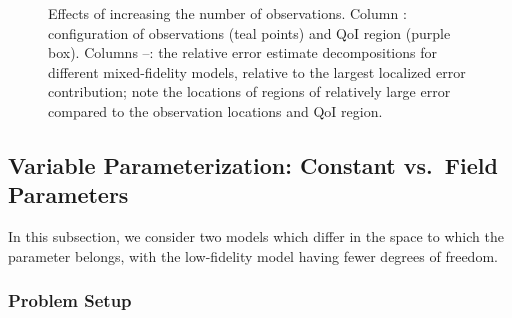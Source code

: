 \documentclass[review,sort&compress]{elsarticle}
\begin{document}
\begin{figure}[htbp]
{  \label{subfig:obsMFlast2}
}
  \caption{Effects of increasing the number of observations. Column \protect{}: configuration of observations (teal points) and QoI region (purple box). Columns \protect{}--\protect{}: the relative error estimate decompositions for different mixed-fidelity models, relative to the largest localized error contribution; note the locations of regions of relatively large error compared to the observation locations and QoI region.}
  \label{fig:dataStudy}
\end{figure}

\subsection{Variable Parameterization: Constant vs.\ Field Parameters} \label{sec:constvfield}

In this subsection, we consider two models which differ in the space to which the parameter belongs, with the low-fidelity model having fewer degrees of freedom. 

\subsubsection{Problem Setup}
\end{document}
